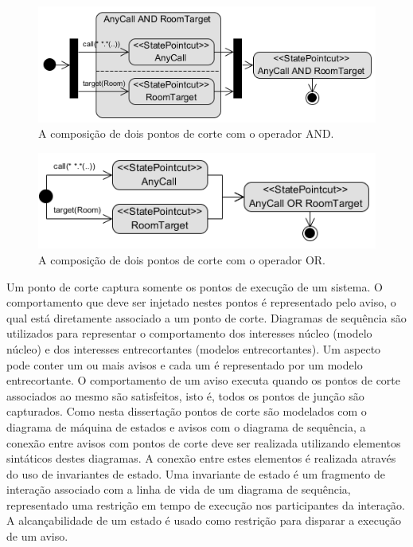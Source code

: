 \begin{figure}[h]
	\centering
	\includegraphics{img/pointcut_definition_and.png}
	\caption{A composição de dois pontos de corte com o operador AND.}\label{fig:pointcut_definition_and}
\end{figure}

\begin{figure}[h]
	\centering
	\includegraphics{img/pointcut_definition_or.png}
	\caption{A composição de dois pontos de corte com o operador OR.}\label{fig:pointcut_definition_or}
\end{figure}

Um ponto de corte captura somente os pontos de execução de um sistema. O comportamento que deve ser injetado nestes pontos é representado pelo aviso,
o qual está diretamente associado a um ponto de corte. Diagramas de sequência são utilizados para representar o comportamento dos interesses núcleo
(modelo núcleo) e dos interesses entrecortantes (modelos entrecortantes). Um aspecto pode conter um ou mais avisos e cada um é representado por um
modelo entrecortante. O comportamento de um aviso executa quando os pontos de corte associados ao mesmo são satisfeitos, isto é, todos os pontos de
junção são capturados. Como nesta dissertação pontos de corte são modelados com o diagrama de máquina de estados e avisos com o diagrama de sequência,
a conexão entre avisos com pontos de corte deve ser realizada utilizando elementos sintáticos destes diagramas. A conexão entre estes elementos é
realizada através do uso de invariantes de estado. Uma invariante de estado é um fragmento de interação associado com a linha de vida de um diagrama
de sequência, representado uma restrição em tempo de execução nos participantes da interação. A alcançabilidade de um estado é usado como restrição
para disparar a execução de um aviso. 

